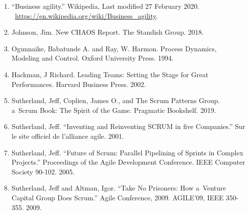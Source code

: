 \documentclass[12pt,a4paper,parskip=full]{scrartcl}
\begin{document}
\begin{enumerate}
\itemsep1pt\parskip0pt
\item
  ``Business agility.'' Wikipedia, Last modified 27 February 2020.
  \newline ~\href{https://en.wikipedia.org/wiki/Business_agility}{https://en.wikipedia.org/wiki/Business\_agility}.
\item
  Johnson, Jim. New CHAOS Report. The Standish Group. 2018.
\item
  Ogunnaike, Babatunde A. and Ray, W. Harmon. Process Dynamics, Modeling and Control. Oxford University Press. 1994.
\item
  Hackman, J Richard. Leading Teams: Setting the Stage for Great Performances. Harvard Business Press. 2002.
\item
  \label{5} Sutherland, Jeff, Coplien, James O., and The Scrum Patterns Group. a~Scrum Book: The Spirit of the Game. Pragmatic Bookshelf. 2019.
\item
  \label{6} Sutherland, Jeff. ``Inventing and Reinventing SCRUM in five Companies.'' Sur le site officiel de l'alliance agile. 2001.
\item 
  \label{7} Sutherland, Jeff. ``Future of Scrum: Parallel Pipelining of Sprints in Complex Projects.'' Proceedings of the Agile Development Conference. IEEE Computer Society 90-102. 2005.
\item
  Sutherland, Jeff and Altman, Igor. ``Take No Prisoners: How a~Venture Capital Group Does Scrum.'' Agile Conference, 2009. AGILE'09, IEEE 350-355. 2009.
\end{enumerate}
\end{document}
